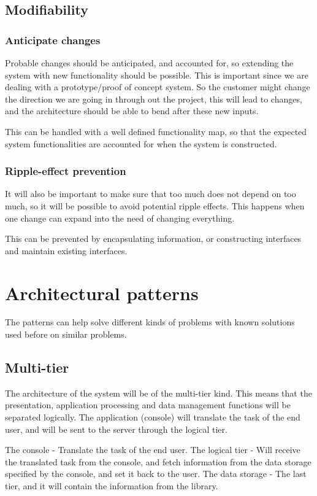 \subsection{Modifiability}
\subsubsection{Anticipate changes}
Probable changes should be anticipated, and accounted for, so extending the system with new functionality should be possible. This is important since we are dealing with a prototype/proof of concept system. So the customer might change the direction we are going in through out the project, this will lead to changes, and the architecture should be able to bend after these new inputs. 

This can be handled with a well defined functionality map, so that the expected system functionalities are accounted for when the system is constructed. 

\subsubsection{Ripple-effect prevention}
It will also be important to make sure that too much does not depend on too much, so it will be possible to avoid potential ripple effects. This happens when one change can expand into the need of changing everything. 

This can be prevented by encapsulating information, or constructing interfaces and maintain existing interfaces. 



\section{Architectural patterns} \label{Architectural patterns}
The patterns can help solve different kinds of problems with known solutions used before on similar problems.

\subsection{Multi-tier}
The architecture of the system will be of the multi-tier kind. This means that the presentation, application processing and data management functions will be separated logically. The application (console) will translate the task of the end user, and will be sent to the server through the logical tier.

The console - Translate the task of the end user.
The logical tier - Will receive the translated task from the console, and fetch information from the data storage specified by the console, and set it back to the user.
The data storage - The last tier, and it will contain the information from the library.

